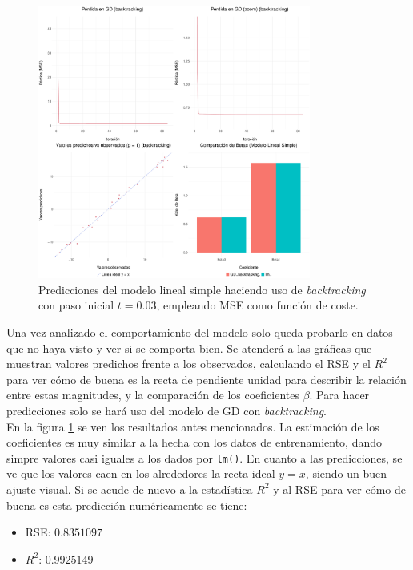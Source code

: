\documentclass[11pt]{opticajnl}
\begin{document}
\begin{figure}[H]
\centering
\includegraphics[width=0.8\textwidth]{fotos/plotmrs_pred.pdf}
\caption{Predicciones del modelo lineal simple haciendo uso de \textit{backtracking} con paso inicial $t=0.03$, empleando MSE como función de coste.}
\label{fig:11}
\end{figure}

Una vez analizado el comportamiento del modelo solo queda probarlo en datos que no haya visto y ver si se comporta bien. Se atenderá a las gráficas que muestran valores predichos frente a los observados, calculando el RSE y el $R^2$ para ver cómo de buena es la recta de pendiente unidad para describir la relación entre estas magnitudes, y la comparación de los coeficientes $\beta$. Para hacer predicciones solo se hará uso del modelo de GD con \textit{backtracking}. \\

En la figura \ref{fig:11} se ven los resultados antes mencionados. La estimación de los coeficientes es muy similar a la hecha con los datos de entrenamiento, dando simpre valores casi iguales a los dados por \texttt{lm()}. En cuanto a las predicciones, se ve que los valores caen en los alrededores la recta ideal $y=x$, siendo un buen ajuste visual. Si se acude de nuevo a la estadística $R^2$ y al RSE para ver cómo de buena es esta predicción numéricamente se tiene:
\begin{multicols}{2}
\begin{itemize}
\item RSE: $0.8351097$
\item $R^2$: $0.9925149$
\end{itemize}
\end{multicols}
\end{document}
